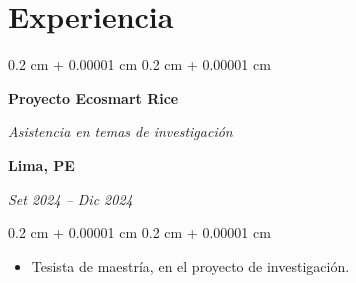 \documentclass[10pt, letterpaper]{article}
\newenvironment{highlights}{
    \begin{itemize}[
        topsep=0.10 cm,
        parsep=0.10 cm,
        partopsep=0pt,
        itemsep=0pt,
        leftmargin=0.4 cm + 10pt
    ]
}{
    \end{itemize}
} %
\newenvironment{onecolentry}{
    \begin{adjustwidth}{
        0.2 cm + 0.00001 cm
    }{
        0.2 cm + 0.00001 cm
    }
}{
    \end{adjustwidth}
} %
\newenvironment{twocolentry}[2][]{
    \onecolentry
    \def\secondColumn{#2}
    \setcolumnwidth{\fill, 4.5 cm}
    \begin{paracol}{2}
}{
    \switchcolumn \raggedleft \secondColumn
    \end{paracol}
    \endonecolentry
} %
\begin{document}

        

    
    \section{Experiencia}


        \begin{twocolentry}{
        \textbf{Lima, PE}    
            
        \textit{Set 2024 – Dic 2024}}
            \textbf{Proyecto Ecosmart Rice}

            \textit{Asistencia en temas de investigación}
        \end{twocolentry}

        \vspace{0.10 cm}
        \begin{onecolentry}
            \begin{highlights}
                \item Tesista de maestría, en el proyecto de investigación.
            \end{highlights}
        \end{onecolentry}
\end{document}
